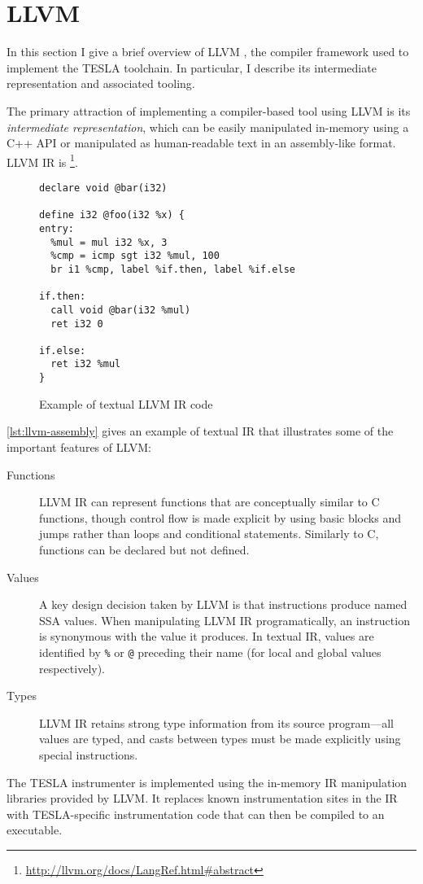 \section{LLVM}

In this section I give a brief overview of LLVM \cite{lattner_llvm:_2002}, the
compiler framework used to implement the TESLA toolchain. In particular, I
describe its intermediate representation and associated tooling.

The primary attraction of implementing a compiler-based tool using LLVM is its
\emph{intermediate representation}, which can be easily manipulated in-memory
using a C++ API or manipulated as human-readable text in an assembly-like
format. LLVM IR is \footnote{\url{http://llvm.org/docs/LangRef.html\#abstract}}.

\begin{figure}
  \begin{verbatim}
declare void @bar(i32)

define i32 @foo(i32 %x) {
entry:
  %mul = mul i32 %x, 3
  %cmp = icmp sgt i32 %mul, 100
  br i1 %cmp, label %if.then, label %if.else

if.then:
  call void @bar(i32 %mul)
  ret i32 0

if.else:
  ret i32 %mul
}
  \end{verbatim}
  \caption{Example of textual LLVM IR code}
  \label{lst:llvm-assembly}
\end{figure}

\autoref{lst:llvm-assembly} gives an example of textual IR that illustrates some
of the important features of LLVM:
\begin{description}
  \item[Functions] LLVM IR can represent functions that are conceptually similar
    to C functions, though control flow is made explicit by using basic blocks
    and jumps rather than loops and conditional statements. Similarly to C,
    functions can be declared but not defined.

  \item[Values] A key design decision taken by LLVM is that instructions produce
    named SSA values. When manipulating LLVM IR programatically, an instruction
    is synonymous with the value it produces. In textual IR, values are
    identified by \texttt{\%} or \texttt{@} preceding their name (for local and
    global values respectively).

  \item[Types] LLVM IR retains strong type information from its source
    program---all values are typed, and casts between types must be made
    explicitly using special instructions.
\end{description}

The TESLA instrumenter is implemented using the in-memory IR manipulation
libraries provided by LLVM. It replaces known instrumentation sites in the IR
with TESLA-specific instrumentation code that can then be compiled to an
executable.
